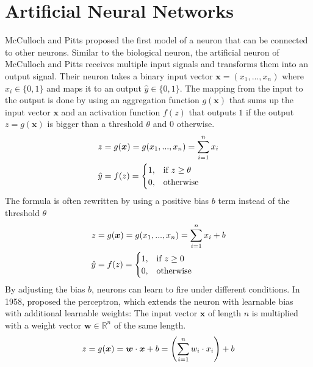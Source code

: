 \section{Artificial Neural Networks}
McCulloch and Pitts  proposed the first model of a neuron that can be connected to other neurons.
Similar to the biological neuron, the artificial neuron of McCulloch and Pitts receives multiple input signals and transforms them into an output signal.
Their neuron takes a binary input vector $\boldsymbol{x} = (x_1, ..., x_n)$ where $x_i \in \{0, 1\}$ and maps it to an output $\hat{y} \in \{0, 1\}$.
The mapping from the input to the output is done by using an aggregation function $g(\boldsymbol{x})$ that sums up the input vector $\boldsymbol{x}$ and an activation function $f(z)$ that outputs $1$ if the output $z = g(\boldsymbol{x})$ is bigger than a threshold $\theta$ and $0$ otherwise.
%
\begin{align}\eqlbl{McCulloch_Pitts_agg}%
	z &= g(\boldsymbol{x}) = g(x_1, ..., x_n) = \sum_{i=1}^{n}x_i\\
		\hat{y} &= f(z) = \begin{cases}
      		1, & \text{if}\ z \geq \theta \\
      		0, & \text{otherwise}
    	\end{cases}
\end{align}
%
The formula is often rewritten by using a positive  bias $b$ term instead of the  threshold $\theta$
%
\begin{align}\eqlbl{McCulloch_Pitts_agg2}%
	z &= g(\boldsymbol{x}) = g(x_1, ..., x_n) = \sum_{i=1}^{n}x_i + b\\
		\hat{y} &= f(z) = \begin{cases}
      		1, & \text{if}\ z \geq 0 \\
      		0, & \text{otherwise}
    	\end{cases}
\end{align}
%
By adjusting the bias $b$, neurons can learn to fire under different conditions.
In 1958,  proposed the perceptron, which extends the neuron with learnable bias with additional learnable weights: The input vector $\boldsymbol{x}$ of length $n$ is multiplied with a weight vector $\boldsymbol{w} \in \mathbb{R}^n$ of the same length.
%
\begin{align}\eqlbl{nn}%
	z = g(\boldsymbol{x}) = \boldsymbol{w} \cdot \boldsymbol{x} + b = \left( \sum_{i=1}^{n}w_i \cdot x_i \right) + b
\end{align}
